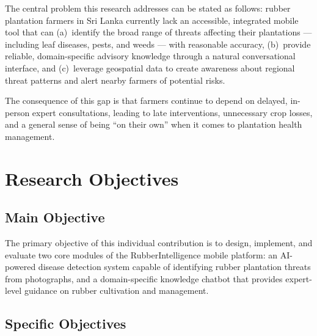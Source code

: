 The central problem this research addresses can be stated as follows: rubber plantation farmers in Sri Lanka currently lack an accessible, integrated mobile tool that can (a)~identify the broad range of threats affecting their plantations --- including leaf diseases, pests, and weeds --- with reasonable accuracy, (b)~provide reliable, domain-specific advisory knowledge through a natural conversational interface, and (c)~leverage geospatial data to create awareness about regional threat patterns and alert nearby farmers of potential risks.

The consequence of this gap is that farmers continue to depend on delayed, in-person expert consultations, leading to late interventions, unnecessary crop losses, and a general sense of being ``on their own'' when it comes to plantation health management.


\section{Research Objectives}

\subsection{Main Objective}

The primary objective of this individual contribution is to design, implement, and evaluate two core modules of the RubberIntelligence mobile platform: an AI-powered disease detection system capable of identifying rubber plantation threats from photographs, and a domain-specific knowledge chatbot that provides expert-level guidance on rubber cultivation and management.

\subsection{Specific Objectives}

